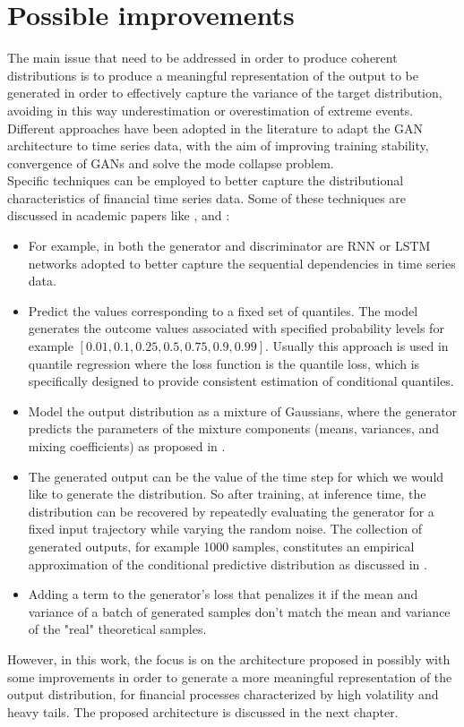 \section{Possible improvements}
The main issue that need to be addressed in order to produce coherent distributions is to produce a meaningful representation of the output to be generated 
in order to effectively capture the variance of the target distribution, 
avoiding in this way underestimation or overestimation of extreme events.
Different approaches have been adopted in the literature to adapt the GAN architecture to time series data, with the aim
of improving training stability, convergence of GANs and solve the mode collapse problem.\\

Specific techniques can be employed to better capture the distributional characteristics of financial time series data.
Some of these techniques are discussed in academic papers like \cite{background:forgan}, \cite{background:md_cgan} and \cite{background:rcgan}:
\begin{itemize}
    \item For example, in \cite{background:rcgan} both the generator and discriminator are RNN or LSTM networks adopted to better capture the sequential dependencies in time series data.
    \item Predict the values corresponding to a fixed set of quantiles. 
    The model generates the outcome values associated with specified probability levels for example $[0.01, 0.1, 0.25, 0.5, 0.75, 0.9, 0.99]$.
    Usually this approach is used in quantile regression where the loss function is the quantile loss, which is specifically designed to provide consistent estimation of conditional quantiles.
    \item Model the output distribution as a mixture of Gaussians, where the generator predicts the parameters of the mixture components (means, variances, and mixing coefficients) as proposed in \cite{background:md_cgan}.
    \item The generated output can be the value of the time step for which we would like to generate the distribution. So after training,
    at inference time, the distribution can be recovered by repeatedly evaluating the generator for a fixed input trajectory while varying the random noise.
    The collection of generated outputs, for example 1000 samples, constitutes an empirical approximation of the conditional predictive distribution as discussed in \cite{background:forgan}.
    \item Adding a term to the generator's loss that penalizes it if the mean and variance of a batch of generated samples don't match the mean and variance of the "real" theoretical samples.
\end{itemize}

However, in this work, the focus is on the architecture proposed in \cite{background:forgan} possibly with some improvements in order to generate a more meaningful representation of the output distribution, for 
financial processes characterized by high volatility and heavy tails. The proposed architecture is discussed in the next chapter.
